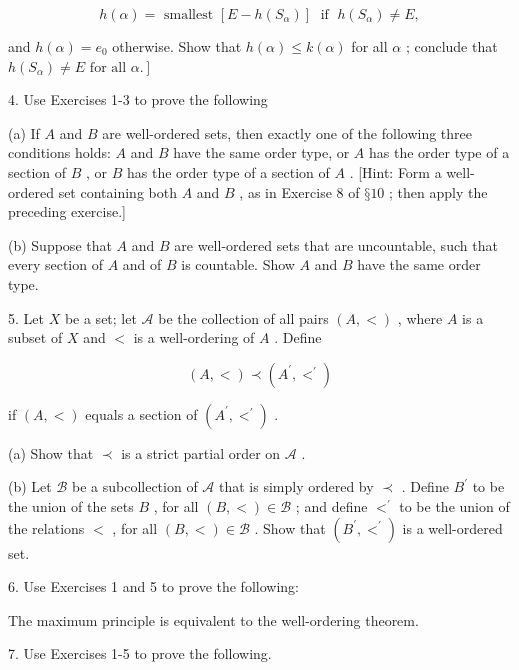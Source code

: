 \[
h\left( \alpha \right)  = \text{ smallest }\left\lbrack  {E - h\left( {S}_{\alpha }\right) }\right\rbrack  \;\text{ if }\;h\left( {S}_{\alpha }\right)  \neq  E,
\]

and \(h\left( \alpha \right)  = {e}_{0}\) otherwise. Show that \(h\left( \alpha \right)  \leq  k\left( \alpha \right)\) for all \(\alpha\) ; conclude that \(\left. {h\left( {S}_{\alpha }\right)  \neq  E\text{ for all }\alpha .}\right\rbrack\)

4. Use Exercises 1-3 to prove the following

(a) If \(A\) and \(B\) are well-ordered sets, then exactly one of the following three conditions holds: \(A\) and \(B\) have the same order type, or \(A\) has the order type of a section of \(B\) , or \(B\) has the order type of a section of \(A\) . [Hint: Form a well-ordered set containing both \(A\) and \(B\) , as in Exercise 8 of \(§{10}\) ; then apply the preceding exercise.]

(b) Suppose that \(A\) and \(B\) are well-ordered sets that are uncountable, such that every section of \(A\) and of \(B\) is countable. Show \(A\) and \(B\) have the same order type.

5. Let \(X\) be a set; let \(\mathcal{A}\) be the collection of all pairs \(\left( {A, < }\right)\) , where \(A\) is a subset of \(X\) and \(<\) is a well-ordering of \(A\) . Define

\[
\left( {A, < }\right)  \prec  \left( {{A}^{\prime },{ < }^{\prime }}\right)
\]

if \(\left( {A, < }\right)\) equals a section of \(\left( {{A}^{\prime },{ < }^{\prime }}\right)\) .

(a) Show that \(\prec\) is a strict partial order on \(\mathcal{A}\) .

(b) Let \(\mathcal{B}\) be a subcollection of \(\mathcal{A}\) that is simply ordered by \(\prec\) . Define \({B}^{\prime }\) to be the union of the sets \(B\) , for all \(\left( {B, < }\right)  \in  \mathcal{B}\) ; and define \({ < }^{\prime }\) to be the union of the relations \(<\) , for all \(\left( {B, < }\right)  \in  \mathcal{B}\) . Show that \(\left( {{B}^{\prime },{ < }^{\prime }}\right)\) is a well-ordered set.

6. Use Exercises 1 and 5 to prove the following:

\begin{theorem} The maximum principle is equivalent to the well-ordering theorem.
\end{theorem}

7. Use Exercises 1-5 to prove the following.

